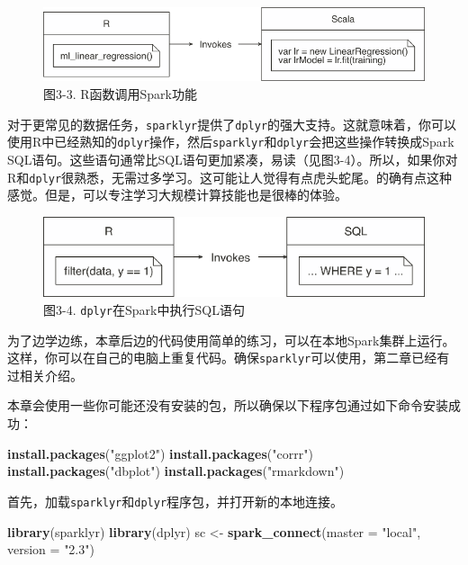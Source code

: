 \documentclass[
]{article}
\newenvironment{Shaded}{\begin{snugshade}}{\end{snugshade}}
\newcommand{\DataTypeTok}[1]{\textcolor[rgb]{0.13,0.29,0.53}{#1}}
\newcommand{\KeywordTok}[1]{\textcolor[rgb]{0.13,0.29,0.53}{\textbf{#1}}}
\newcommand{\NormalTok}[1]{#1}
\newcommand{\StringTok}[1]{\textcolor[rgb]{0.31,0.60,0.02}{#1}}
\begin{document}
\begin{figure}
\centering
\includegraphics{figures/3_3.png}
\caption{图3-3. R函数调用Spark功能}
\end{figure}

对于更常见的数据任务，\texttt{sparklyr}提供了\texttt{dplyr}的强大支持。这就意味着，你可以使用R中已经熟知的\texttt{dplyr}操作，然后\texttt{sparklyr}和\texttt{dplyr}会把这些操作转换成Spark
SQL语句。这些语句通常比SQL语句更加紧凑，易读（见图3-4）。所以，如果你对R和\texttt{dplyr}很熟悉，无需过多学习。这可能让人觉得有点虎头蛇尾。的确有点这种感觉。但是，可以专注学习大规模计算技能也是很棒的体验。

\begin{figure}
\centering
\includegraphics{figures/3_4.png}
\caption{图3-4. \texttt{dplyr}在Spark中执行SQL语句}
\end{figure}

为了边学边练，本章后边的代码使用简单的练习，可以在本地Spark集群上运行。这样，你可以在自己的电脑上重复代码。确保\texttt{sparklyr}可以使用，第二章已经有过相关介绍。

本章会使用一些你可能还没有安装的包，所以确保以下程序包通过如下命令安装成功：

\begin{Shaded}
\begin{Highlighting}[]
\KeywordTok{install.packages}\NormalTok{(}\StringTok{"ggplot2"}\NormalTok{)}
\KeywordTok{install.packages}\NormalTok{(}\StringTok{"corrr"}\NormalTok{)}
\KeywordTok{install.packages}\NormalTok{(}\StringTok{"dbplot"}\NormalTok{)}
\KeywordTok{install.packages}\NormalTok{(}\StringTok{"rmarkdown"}\NormalTok{)}
\end{Highlighting}
\end{Shaded}

首先，加载\texttt{sparklyr}和\texttt{dplyr}程序包，并打开新的本地连接。

\begin{Shaded}
\begin{Highlighting}[]
\KeywordTok{library}\NormalTok{(sparklyr)}
\KeywordTok{library}\NormalTok{(dplyr)}
\NormalTok{sc <-}\StringTok{ }\KeywordTok{spark_connect}\NormalTok{(}\DataTypeTok{master =} \StringTok{"local"}\NormalTok{, }\DataTypeTok{version =} \StringTok{"2.3"}\NormalTok{)}
\end{Highlighting}
\end{Shaded}
\end{document}
